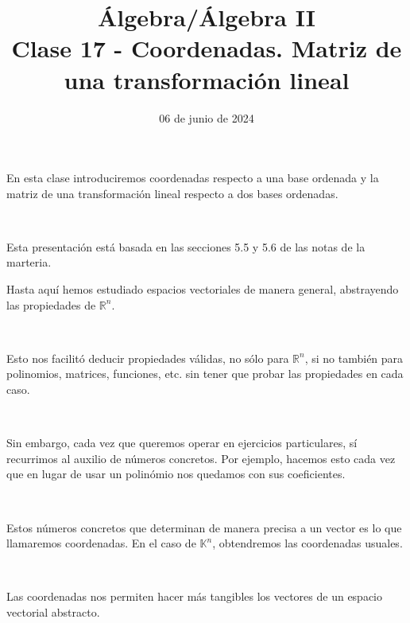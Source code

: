 \documentclass[handout]{beamer} %
\title[Clase 17 - Coordenadas. Matriz de una transformación lineal]{Álgebra/Álgebra II \\ Clase 17 - Coordenadas. Matriz de una transformación lineal}
\author[]{}
\institute[]{\normalsize FAMAF / UNC
	\\[\baselineskip] ${}^{}$
	\\[\baselineskip]
}
\date[06/06/2024]{06 de junio de 2024}
\newcommand{\R}{\mathbb R}
\newcommand{\K}{\mathbb K}
\begin{document}
\begin{frame}
\maketitle
\end{frame}



\begin{frame}

    En esta clase introduciremos coordenadas respecto a una base ordenada y la matriz de una transformación lineal respecto a dos bases ordenadas.\pause
    
    \
    
    Esta presentación está basada  en las secciones 5.5 y 5.6 de las notas de la marteria.\pause
    \
    
    \end{frame}
    
    
        \begin{frame}
        
        Hasta aquí hemos estudiado espacios vectoriales de manera general, abstrayendo las propiedades de $\R^n$.\pause
        
        \
        
        Esto nos facilitó deducir propiedades válidas, no sólo para $\R^n$, si no también para polinomios, matrices, funciones, etc. sin tener que probar las propiedades en cada caso.\pause
        
        \
        
        Sin embargo, cada vez que queremos operar en ejercicios particulares, sí recurrimos al auxilio de números concretos. Por ejemplo, hacemos esto cada vez que en lugar de usar un polinómio nos quedamos con sus coeficientes.\pause
        
        \
        
        Estos números concretos que determinan de manera precisa a un vector es lo que llamaremos coordenadas. En el caso de $\K^n$, obtendremos las coordenadas usuales.\pause
        
        \
        
        Las coordenadas nos permiten hacer más tangibles los vectores de un espacio vectorial abstracto.
        \end{frame}
        
\end{document}
